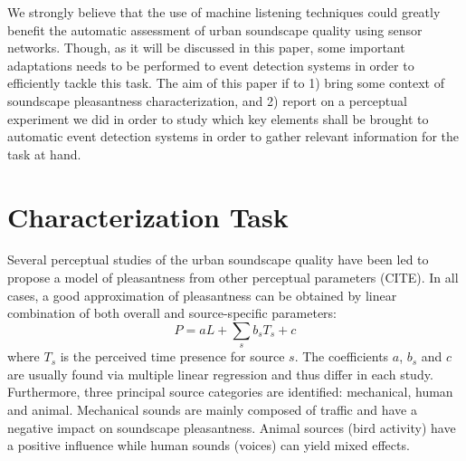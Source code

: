 \documentclass{article}
\begin{document}
\begin{sloppy}

We strongly believe that the use of machine listening techniques could greatly benefit the automatic assessment of urban soundscape quality using sensor networks. Though, as it will be discussed in this paper, some important adaptations needs to be performed to event detection systems in order to efficiently tackle this task. The aim of this paper if to 1) bring some context of soundscape pleasantness characterization, and 2) report on a perceptual experiment we did in order to study which key elements shall be brought to automatic event detection systems in order to gather relevant information for the task at hand. 

\clearpage

\section{Characterization Task}
\label{sec:char}
Several perceptual studies of the urban soundscape quality have been led to propose a model of pleasantness from other perceptual parameters (CITE). In all cases, a good approximation of pleasantness can be obtained by linear combination of both overall and source-specific parameters:
\begin{equation}
P = aL + \sum_s b_sT_s + c
\end{equation}
where $T_s$ is the perceived time presence for source $s$. The coefficients $a$, $b_s$ and $c$ are usually found via multiple linear regression and thus differ in each study.
Furthermore, three principal source categories are identified: mechanical, human and animal. Mechanical sounds are mainly composed of traffic and have a negative impact on soundscape pleasantness. Animal sources (bird activity) have a positive influence while human sounds (voices) can yield mixed effects.


\end{sloppy}
\end{document}
